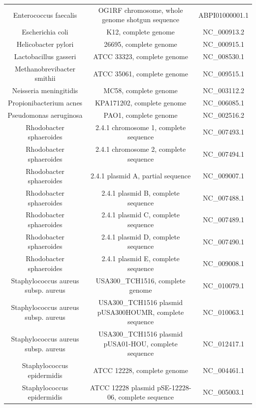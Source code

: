 \documentclass[10pt]{bmc_article}
\newenvironment{bmcformat}{\begin{raggedright}\baselineskip20pt\sloppy\setboolean{publ}{false}}{\end{raggedright}\baselineskip20pt\sloppy}
\begin{document}
\begin{bmcformat}
{\begin{tabular}{|c|c|c|}
        Enterococcus faecalis & OG1RF chromosome, whole genome shotgun sequence &  ABPI01000001.1 \\
        Escherichia coli & K12, complete genome &  NC\_000913.2 \\
        Helicobacter pylori & 26695, complete genome &     NC\_000915.1 \\ 
        Lactobacillus gasseri & ATCC 33323, complete genome &      NC\_008530.1 \\
        Methanobrevibacter smithii & ATCC 35061, complete genome &  NC\_009515.1 \\
        Neisseria meningitidis & MC58, complete genome &   NC\_003112.2 \\
        Propionibacterium acnes & KPA171202, complete genome &     NC\_006085.1 \\
        Pseudomonas aeruginosa &  PAO1, complete genome &   NC\_002516.2 \\
        Rhodobacter sphaeroides & 2.4.1 chromosome 1, complete sequence &  NC\_007493.1 \\
        Rhodobacter sphaeroides & 2.4.1 chromosome 2, complete sequence &  NC\_007494.1 \\
        Rhodobacter sphaeroides & 2.4.1 plasmid A, partial sequence &      NC\_009007.1 \\
        Rhodobacter sphaeroides & 2.4.1 plasmid B, complete sequence &     NC\_007488.1 \\
        Rhodobacter sphaeroides & 2.4.1 plasmid C, complete sequence &     NC\_007489.1 \\
        Rhodobacter sphaeroides & 2.4.1 plasmid D, complete sequence &     NC\_007490.1 \\
        Rhodobacter sphaeroides & 2.4.1 plasmid E, complete sequence &     NC\_009008.1 \\
        Staphylococcus aureus subsp. aureus & USA300\_TCH1516, complete genome &    NC\_010079.1 \\
        Staphylococcus aureus subsp. aureus & USA300\_TCH1516 plasmid pUSA300HOUMR, complete sequence &      NC\_010063.1 \\
        Staphylococcus aureus subsp. aureus & USA300\_TCH1516 plasmid pUSA01-HOU, complete sequence &       NC\_012417.1 \\
        Staphylococcus epidermidis & ATCC 12228, complete genome &  NC\_004461.1 \\
        Staphylococcus epidermidis & ATCC 12228 plasmid pSE-12228-06, complete sequence &   NC\_005003.1 \\

\end{tabular}}
\end{bmcformat}
\end{document}
